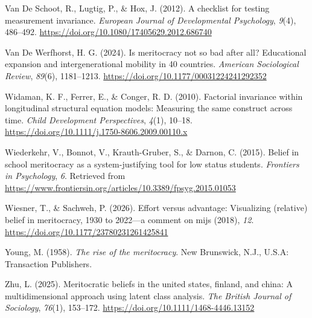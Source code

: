 \documentclass[
  11pt,
]{article}
\newlength{\cslhangindent}
\newenvironment{CSLReferences}[2] %
 {\begin{list}{}{%
  \setlength{\itemindent}{0pt}
  \setlength{\leftmargin}{0pt}
  \setlength{\parsep}{0pt}
  \ifodd #1
   \setlength{\leftmargin}{\cslhangindent}
   \setlength{\itemindent}{-1\cslhangindent}
  \fi
  \setlength{\itemsep}{#2\baselineskip}}}
 {\end{list}}
\begin{document}
\begin{CSLReferences}{1}{0}
Van De Schoot, R., Lugtig, P., \& Hox, J. (2012). A checklist for
testing measurement invariance. \emph{European Journal of Developmental
Psychology}, \emph{9}(4), 486--492.
\url{https://doi.org/10.1080/17405629.2012.686740}

Van De Werfhorst, H. G. (2024). Is meritocracy not so bad after all?
Educational expansion and intergenerational mobility in 40 countries.
\emph{American Sociological Review}, \emph{89}(6), 1181--1213.
\url{https://doi.org/10.1177/00031224241292352}

Widaman, K. F., Ferrer, E., \& Conger, R. D. (2010). Factorial
invariance within longitudinal structural equation models: Measuring the
same construct across time. \emph{Child Development Perspectives},
\emph{4}(1), 10--18.
\url{https://doi.org/10.1111/j.1750-8606.2009.00110.x}

Wiederkehr, V., Bonnot, V., Krauth-Gruber, S., \& Darnon, C. (2015).
Belief in school meritocracy as a system-justifying tool for low status
students. \emph{Frontiers in Psychology}, \emph{6}. Retrieved from
\url{https://www.frontiersin.org/articles/10.3389/fpsyg.2015.01053}

Wiesner, T., \& Sachweh, P. (2026). Effort versus advantage: Visualizing
(relative) belief in meritocracy, 1930 to 2022---a comment on mijs
(2018), \emph{12}. \url{https://doi.org/10.1177/23780231261425841}

Young, M. (1958). \emph{The rise of the meritocracy}. New Brunswick,
N.J., U.S.A: Transaction Publishers.

Zhu, L. (2025). Meritocratic beliefs in the united states, finland, and
china: A multidimensional approach using latent class analysis.
\emph{The British Journal of Sociology}, \emph{76}(1), 153--172.
\url{https://doi.org/10.1111/1468-4446.13152}

\end{CSLReferences}
\end{document}
